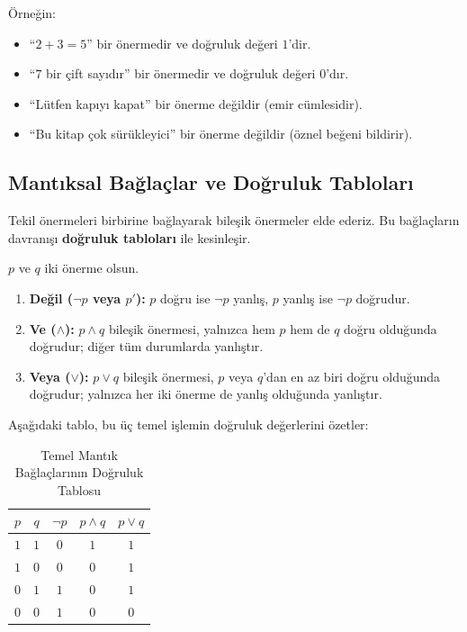 Örneğin:
\begin{itemize}
  \item ``$2 + 3 = 5$'' bir önermedir ve doğruluk değeri $1$'dir.
  \item ``$7$ bir çift sayıdır'' bir önermedir ve doğruluk değeri $0$'dır.
  \item ``Lütfen kapıyı kapat'' bir önerme değildir (emir cümlesidir).
  \item ``Bu kitap çok sürükleyici'' bir önerme değildir (öznel beğeni bildirir).
\end{itemize}

\subsection{Mantıksal Bağlaçlar ve Doğruluk Tabloları}

Tekil önermeleri birbirine bağlayarak bileşik önermeler elde ederiz. Bu bağlaçların davranışı \textbf{doğruluk tabloları} ile kesinleşir.

\begin{definition}
$p$ ve $q$ iki önerme olsun.
\begin{enumerate}
  \item \textbf{Değil ($\neg p$ veya $p'$):} $p$ doğru ise $\neg p$ yanlış, $p$ yanlış ise $\neg p$ doğrudur.
  \item \textbf{Ve ($\land$):} $p \land q$ bileşik önermesi, yalnızca hem $p$ hem de $q$ doğru olduğunda doğrudur; diğer tüm durumlarda yanlıştır.
  \item \textbf{Veya ($\lor$):} $p \lor q$ bileşik önermesi, $p$ veya $q$'dan en az biri doğru olduğunda doğrudur; yalnızca her iki önerme de yanlış olduğunda yanlıştır.
\end{enumerate}
\end{definition}

Aşağıdaki tablo, bu üç temel işlemin doğruluk değerlerini özetler:

\begin{table}[htbp]
\centering
\begin{tabular}{cc|c|c|c}
\toprule
$p$ & $q$ & $\neg p$ & $p \land q$ & $p \lor q$ \\
\midrule
$1$ & $1$ & $0$ & $1$ & $1$ \\
$1$ & $0$ & $0$ & $0$ & $1$ \\
$0$ & $1$ & $1$ & $0$ & $1$ \\
$0$ & $0$ & $1$ & $0$ & $0$ \\
\bottomrule
\end{tabular}
\caption{Temel Mantık Bağlaçlarının Doğruluk Tablosu}
\end{table}

